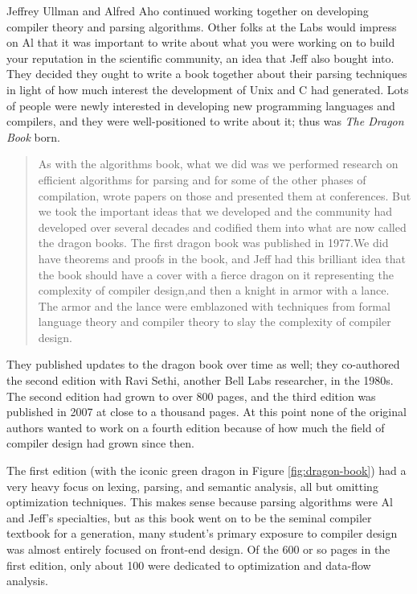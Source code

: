 Jeffrey Ullman and Alfred Aho continued working together on
developing compiler theory and parsing algorithms.
Other folks at the Labs would impress on Al that it was important to write
about what you were working on to build your reputation in the
scientific community, an idea that Jeff also bought into.
They decided they ought to write a book together about their parsing
techniques in light of how much interest the development of Unix and C
had generated. Lots of people were newly interested in developing new
programming languages and compilers, and they were well-positioned to
write about it; thus was \textit{The Dragon Book} born.

\begin{quotation}
	As with the algorithms book, what we did was we performed research
	on efficient algorithms for parsing and for some of the other phases of
	compilation, wrote papers on those and presented them at conferences. But we
	took the important ideas that we developed and the community had developed over
	several decades and codified them into what are now called the dragon books. The
	first dragon book was published in 1977.We did have theorems and proofs in the
	book, and Jeff had this brilliant idea that the book should have a cover with a
	fierce dragon on it representing the complexity of compiler design,and then a
	knight in armor with a lance. The armor and the lance were emblazoned with
	techniques from formal language theory and compiler theory to slay the
	complexity of compiler design.
	\cite{aho_oral_history_2022}
\end{quotation}

They published updates to the dragon book over time as well;
they co-authored the second edition with Ravi Sethi, another Bell Labs researcher,
in the 1980s. The second edition had grown to over 800 pages, and the third edition
was published in 2007 at close to a thousand pages.
At this point none of the original authors wanted to work on a fourth edition
because of how much the field of compiler design had grown since then.

The first edition (with the iconic green dragon in Figure \ref{fig:dragon-book})
had a very heavy focus
on lexing, parsing, and semantic analysis, all but omitting optimization
techniques. This makes sense because parsing algorithms were Al and Jeff's specialties,
but as this book went on to be the seminal compiler textbook for a generation,
many student's primary exposure to compiler design was almost entirely focused on
front-end design.
Of the 600 or so pages in the first edition, only about 100 were dedicated to
optimization and data-flow analysis\cite[Chapters 12, 13, and 14]{the_dragon_book_aho_ullman_1977}.

